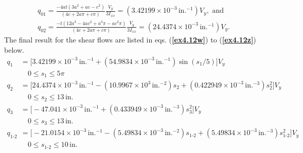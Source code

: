 \documentclass{AeroStructure-ERJohnson}
\begin{document}
\begin{example}
\begin{gather}\label{ex4.12u}
q_{01}=\frac{-4 a t(3 a^{2}+a c-c^{2})}{(4 c+2 a \pi+c \pi)} \frac{V_{y}}{3 I_{x x}}=(3.42199 \times 10^{-3}\,\textrm{in}.^{-1}) V_{y}, \text{ and}\\[7pt]
q_{02}=\frac{-t(12 a^{3}-4 a c^{2}+a^{3} \pi-a c^{2} \pi)}{(4 c+2 a \pi+c \pi)} \frac{V_{y}}{3 I_{x x}}=(24.4374 \times 10^{-3}\,\textrm{in}.^{-1}) V_{y}.\label{ex4.12v}
\end{gather}
The final result for the shear flows are listed in eqs. (\textbf{\ref{ex4.12w}}) to (\textbf{\ref{ex4.12z}}) below.
\begin{align}
q_{1} &=\big[3.42199 \times 10^{-3}\,\textrm{in}.^{-1}+(54.9834 \times 10^{-3}\,\textrm{in}.^{-1}) \sin (s_{1}/5)\big] V_{y}\nonumber\\
&\quad 0 \leq s_{1} \leq 5 \pi\label{ex4.12w}\\[6pt]
q_{2}&=\big[24.4374 \times 10^{-3}\,\textrm{in}.^{-1}-(10.9967 \times 10^{3}\,\textrm{in}.^{-2}) s_{2}+(0.422949 \times 10^{-3}\,\textrm{in}.^{-3}) s_{2}^{2}\big] V_{y}\nonumber\\
& \quad 0 \leq s_{2} \leq 13\,\textrm{in}. \label{ex4.12x}\\[6pt]
q_{3}&=\big[-47.041 \times 10^{-3}\,\textrm{in}.^{-1}+(0.433949 \times 10^{-3}\,\textrm{in}.^{-3}) s_{3}^{2}\big] V_{y}\nonumber\\
& \quad 0 \leq s_{3} \leq 13\,\textrm{in}.\label{ex4.12y}\\[6pt]
q_{\textrm{1-2}}&=\big[-21.0154 \times 10^{-3}\,\textrm{in}.^{-1}-(5.49834 \times 10^{-3}\,\textrm{in}.^{-2}) s_{\textrm{1-2}}+(5.49834 \times 10^{-3}\,\textrm{in}.^{-3}) s_{\textrm{1-2}}^{2}\big] V_{y}\nonumber\\
& \quad 0 \leq s_{\textrm{1-2}} \leq 10\,\textrm{in}.\label{ex4.12z}
\end{align}


\end{example}
\end{document}
